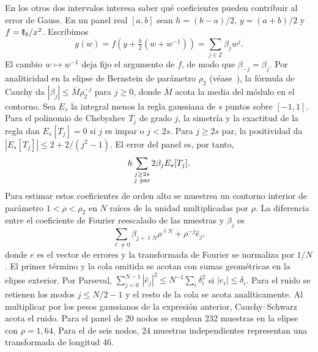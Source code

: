 En los otros dos intervalos interesa saber qué coeficientes pueden contribuir al error de Gauss.
En un panel real $[a,b]$ sean $h=(b-a)/2$, $y=(a+b)/2$ y $f=\mathfrak{k}_6/x^2$. Escribimos
\[
 g(w)=f\!\left(y+\tfrac h2(w+w^{-1})\right)
      =\sum_{j\in\mathbb Z}\beta_jw^j .
\]
El cambio $w\mapsto w^{-1}$ deja fijo el argumento de $f$, de modo que $\beta_{-j}=\beta_j$.
Por analiticidad en la elipse de Bernstein de parámetro $\rho_2$ (véase~\cite{trefethen}), la
fórmula de Cauchy da
$|\beta_j|\le\overline M\rho_2^{-j}$ para $j\ge0$, donde $\overline M$ acota la media del
módulo en el contorno. Sea $E_s$ la integral menos la regla gaussiana de $s$ puntos sobre $[-1,1]$.
Para el polinomio de Chebyshev $T_j$ de grado $j$, la simetría y la exactitud de la regla dan
$E_s[T_j]=0$ si $j$ es impar o $j<2s$. Para $j\ge2s$ par, la positividad da
$|E_s[T_j]|\le2+2/(j^2-1)$. El error del panel es, por tanto,
\[
 h\sum_{\substack{j\ge2s\\j\ {\rm par}}}2\beta_j E_s[T_j].
\]
Para estimar estos coeficientes de orden alto se muestrea un contorno interior de parámetro
$1<\rho<\rho_2$ en $N$ raíces de la unidad multiplicadas por $\rho$. La diferencia entre el
coeficiente de Fourier reescalado de las muestras y $\beta_j$ es
\[
 \sum_{\ell\ne0}\beta_{j+\ell N}\rho^{\ell N}+\rho^{-j}\widehat e_j ,
\]
donde $e$ es el vector de errores y la transformada de Fourier se normaliza por $1/N$. El primer
término y la cola omitida se acotan con sumas geométricas en la elipse exterior. Por Parseval,
$\sum_{j=0}^{N-1}|\widehat e_j|^2\le N^{-1}\sum_i\delta_i^2$ si $|e_i|\le\delta_i$.
Para el ruido se retienen los modos $j\le N/2-1$ y el resto de la cola se acota analíticamente. Al
multiplicar por los pesos gaussianos de la expresión anterior, Cauchy--Schwarz acota el ruido. Para el
panel de 20 nodos se emplean 232 muestras en la elipse con $\rho=1{,}64$. Para el de seis nodos, 24
muestras independientes representan una transformada de longitud 46.

